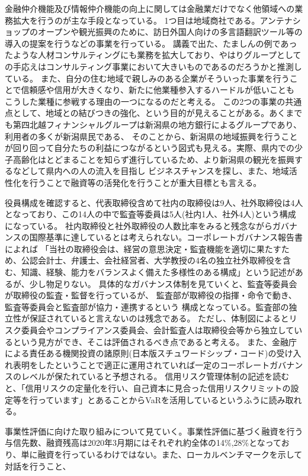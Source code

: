 \documentclass[11pt]{jsarticle}
\begin{document}
    \par 金融仲介機能及び情報仲介機能の向上に関しては金融業だけでなく他領域への業務拡大を行うのが主な手段となっている。
    1つ目は地域商社である。アンテナショップのオープンや観光振興のために、訪日外国人向けの多言語翻訳ツール等の導入の提案を行うなどの事業を行っている。
    講義で出た、たましんの例であったような人材コンサルティングにも業務を拡大しており、やはりグループとしての手応えはコンサルティング事業において大きいものであるのだろうかと推測している。
    また、自分の住む地域で親しみのある企業がそういった事業を行うことで信頼感や信用が大きくなり、新たに他業種参入するハードルが低いことも こうした業種に参戦する理由の一つになるのだと考える。
    この2つの事業の共通点として、地域との結びつきの強化、という目的が見えることがある。あくまでも第四北越フィナンシャルグループは新潟県の地方銀行によるグループであり、利用者の多くが新潟県民である、
    そのことから、新潟県の地域振興を行うことが回り回って自分たちの利益につながるという図式も見える。実際、県内での少子高齢化はとどまることを知らず進行しているため、より新潟県の観光を振興するなどして県内への人の流入を目指し
    ビジネスチャンスを探し、また、地域活性化を行うことで融資等の活発化を行うことが重大目標とも言える。
    \par 役員構成を確認すると、代表取締役含めて社内の取締役は9人、社外取締役は4人となっており、この14人の中で監査等委員は5人(社内1人、社外4人)という構成になっている。
    社内取締役と社外取締役の人数比率をみると残念ながらガバナンスの国際基準に達しているとは考えられない。コーポレートガバナンス報告書によれば
    「当社の取締役会は、経営の意思決定・監査機能を適切に果たすため、公認会計士、弁護士、会社経営者、大学教授の4名の独立社外取締役を含む、知識、経験、能力をバランスよく備えた多様性のある構成」という記述があるが、少し物足りない。
    具体的なガバナンス体制を見ていくと、監査等委員会が取締役の監査・監督を行っているが、
    監査部が取締役の指揮・命令で動き、監査等委員会と監査部が協力・連携するという 構成となっている。監査部の独立性が保証されていると言えないのは残念である。
    ただし、体制図によるとリスク委員会やコンプライアンス委員会、会計監査人は取締役会等から独立しているという見方ができ、そこは評価されるべき点であると考える。
    また、金融庁による責任ある機関投資の諸原則(日本版スチュワードシップ・コード)の受け入れ表明をしたということで適正に運用されていれば一定のコーポレートガバナンスのレベルが保たれていると予想される。
    信用リスク管理体制の記述を読むと、「信用リスクの定量化を行い、自己資本に見合った信用リスクリミットの設定等を行っています」とあることからVaRを活用しているというふうに読み取れる。
    \par 事業性評価に向けた取り組みについて見ていく。事業性評価に基づく融資を行う与信先数、融資残高は2020年3月期にはそれぞれ約全体の14\%,28\%となっており、単に融資を行っているわけではない。また、ローカルベンチマークを示して対話を行うこと、
\end{document}
